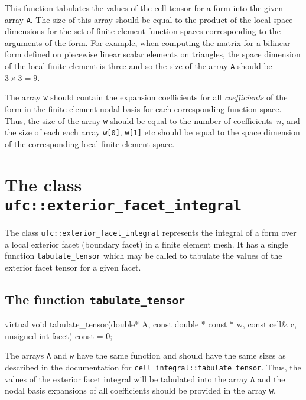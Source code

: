 This function tabulates the values of the cell tensor for a form into
the given array \texttt{A}. The size of this array should be equal to
the product of the local space dimensions for the set of finite
element function spaces corresponding to the arguments of the
form. For example, when computing the matrix for a bilinear form
defined on piecewise linear scalar elements on triangles, the space dimension
of the local finite element is three and so the size of the array
\texttt{A} should be $3 \times 3 = 9$.

The array \texttt{w} should contain the expansion coefficients for all
\emph{coefficients} of the form in the finite element nodal basis for
each corresponding function space. Thus, the size of the array
\texttt{w} should be equal to the number of coefficients~$n$, and the
size of each each array \texttt{w[0]}, \texttt{w[1]} etc should be
equal to the space dimension of the corresponding local finite element
space.

\section{The class \texttt{ufc::exterior\_facet\_integral}}

The class \texttt{ufc::exterior\_facet\_integral} represents the
integral of a form over a local exterior facet (boundary facet) in a
finite element mesh. It has a single function
\texttt{tabulate\_tensor} which may be called to tabulate the values
of the exterior facet tensor for a given facet.

\subsection{The function \texttt{tabulate\_tensor}}

\begin{code}
virtual void tabulate_tensor(double* A,
                             const double * const * w,
                             const cell& c,
                             unsigned int facet) const = 0;
\end{code}

The arrays \texttt{A} and \texttt{w} have the same function and should
have the same sizes as described in the documentation for
\texttt{cell\_integral::tabulate\_tensor}. Thus, the values of the
exterior facet integral will be tabulated into the array \texttt{A}
and the nodal basis expansions of all coefficients should be provided
in the array \texttt{w}.

